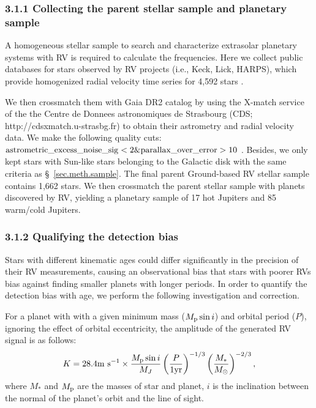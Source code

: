 \documentclass[twocolumn]{pnas-new}
\begin{document}
\subsubsection*{3.1.1 Collecting the parent stellar sample and planetary sample}
\label{sec.obs.RV.sample}
A homogeneous stellar sample to search and characterize extrasolar planetary systems with RV is required to calculate the frequencies.
Here we collect public databases for stars observed by RV projects (i.e., Keck, Lick, HARPS), which provide homogenized radial velocity time series for 4,592 stars \citep{2014ApJS..210....5F,2017AJ....153..208B,2020A&A...636A..74T}.

We then crossmatch them with Gaia DR2 catalog by using the X-match service of
the the Centre de Donnees astronomiques de Strasbourg (CDS;
http://cdsxmatch.u-strasbg.fr) to obtain their astrometry and radial velocity data.
We make the
following quality cuts:
$\rm astrometric\_excess\_noise\_sig<2 \& parallax\_over\_error>10$ \citep{2018A&A...616A...2L}.
Besides, we only kept stars with Sun-like stars belonging to the Galactic disk with the same criteria as \S~\ref{sec.meth.sample}.
The final parent Ground-based RV stellar sample contains 1,662 stars.
We then crossmatch the parent stellar sample with planets discovered by RV, yielding a planetary sample of 17 hot Jupiters and 85 warm/cold Jupiters.
 

\subsubsection*{3.1.2 Qualifying the detection bias}
\label{sec.obs.RV.debias}
Stars with different kinematic ages could differ significantly in the precision
of their RV measurements, causing an observational bias that stars with poorer RVs bias against finding smaller planets with longer periods.
In order to quantify the detection bias with age, we perform the following investigation and correction.

For a planet with with a given minimum mass ($M_{\rm p} \sin{i}$) and
orbital period ($P$), ignoring the effect of orbital eccentricity, the amplitude of the generated RV signal is as follows:
\begin{equation}
  K = 28.4 {\rm m \ s^{-1}} \times \frac{M_{\rm p} \sin{i}}{M_{J}} \left(\frac{P}{1 \rm yr}\right)^{-1/3} \left(\frac{M_*}{M_\odot}\right)^{-2/3},
\end{equation}
where $M_*$ and $M_{\rm p}$ are the masses of star and planet, $i$ is the inclination between
the normal of the planet’s orbit and the line of sight.
\end{document}
